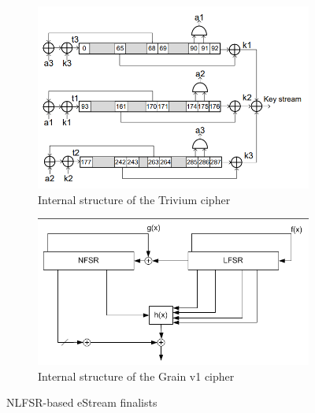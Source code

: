 \begin{description}
\begin{figure}[h]
			\begin{subfigure}{0.5\textwidth}
				\includegraphics[width=1\textwidth]{img/trivium.png} 
				\caption{Internal structure of the Trivium cipher}
				\label{fig:trivium}
			\end{subfigure}
			\begin{subfigure}{0.5\textwidth}
				\includegraphics[width=1\textwidth]{img/grainv1.png} 
				\caption{Internal structure of the Grain v1 cipher}
				\label{fig:grainv1}
			\end{subfigure}
			
			\caption{NLFSR-based eStream finalists}
			\label{fig:NLFSR}
			
		\end{figure}
		

\end{description}
